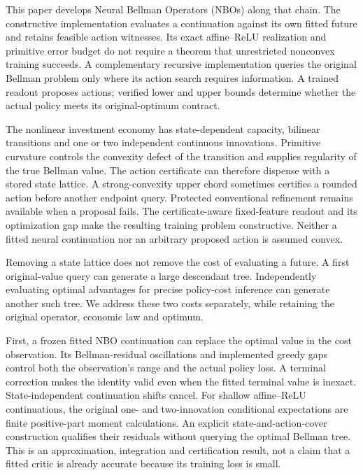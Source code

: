 \documentclass[ecta,nameyear,draft]{econsocart}
\begin{document}
This paper develops Neural Bellman Operators (NBOs) along that chain. The constructive implementation evaluates a continuation against its own fitted future and retains feasible action witnesses. Its exact affine--ReLU realization and primitive error budget do not require a theorem that unrestricted nonconvex training succeeds. A complementary recursive implementation queries the original Bellman problem only where its action search requires information. A trained readout proposes actions; verified lower and upper bounds determine whether the actual policy meets its original-optimum contract.

The nonlinear investment economy has state-dependent capacity, bilinear transitions and one or two independent continuous innovations. Primitive curvature controls the convexity defect of the transition and supplies regularity of the true Bellman value. The action certificate can therefore dispense with a stored state lattice. A strong-convexity upper chord sometimes certifies a rounded action before another endpoint query. Protected conventional refinement remains available when a proposal fails. The certificate-aware fixed-feature readout and its optimization gap make the resulting training problem constructive. Neither a fitted neural continuation nor an arbitrary proposed action is assumed convex.

Removing a state lattice does not remove the cost of evaluating a future. A first original-value query can generate a large descendant tree. Independently evaluating optimal advantages for precise policy-cost inference can generate another such tree. We address these two costs separately, while retaining the original operator, economic law and optimum.

First, a frozen fitted NBO continuation can replace the optimal value in the cost observation. Its Bellman-residual oscillations and implemented greedy gaps control both the observation's range and the actual policy loss. A terminal correction makes the identity valid even when the fitted terminal value is inexact. State-independent continuation shifts cancel. For shallow affine--ReLU continuations, the original one- and two-innovation conditional expectations are finite positive-part moment calculations. An explicit state-and-action-cover construction qualifies their residuals without querying the optimal Bellman tree. This is an approximation, integration and certification result, not a claim that a fitted critic is already accurate because its training loss is small.
\end{document}
